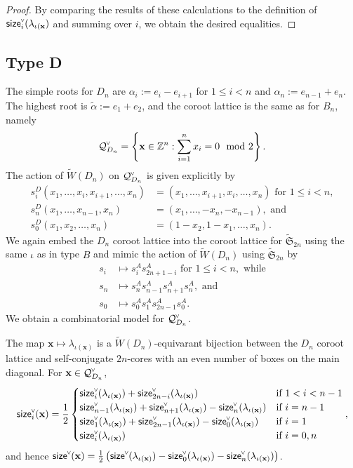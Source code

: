 \documentclass[ALCO,published]{cedram}
\newcommand{\chk}[1]{#1^{\normalfont\smash{\scalebox{.5}[.5]{\rotatebox{90}{\textbf{\textless}}}}}}
\newcommand{\wa}{\widetilde{W}}
\newcommand{\Q}{\mathcal{Q}}
\newcommand{\size}{{\sf size}}
\begin{document}
\begin{proof}
By comparing the results of these calculations to the definition of $\chk{\size}_i(\lambda_{\iota(\mathbf{x}})$ and summing over $i$, we obtain the desired equalities.
\end{proof}


\subsection{Type D}
\label{sec:modelD}

The simple roots for $D_n$ are $\alpha_i:=e_i-e_{i+1}$ for $1\leq i < n$ and $\alpha_n:=e_{n-1}+e_n$.  The highest root is $\widetilde{\alpha}:=e_1+e_2$, and the coroot lattice is the same as for $B_n$, namely \[\chk{\Q}_{D_n} = \left\{\mathbf{x} \in \mathbb{Z}^n : \sum_{i=1}^n x_i = 0 \mod 2\right\}.\]  The action of $\wa(D_n)$ on $\chk{\Q}_{D_n}$ is given explicitly by
\begin{align*}s_i^D(x_1,\ldots,x_i,x_{i+1},\ldots,x_n) &= (x_1,\ldots,x_{i+1},x_{i},\ldots,x_n) \text{ for } 1 \leq i < n,\\
s_n^D(x_1,\ldots,x_{n-1},x_n) &= (x_1,\ldots,-x_n,-x_{n-1}), \text{ and }\\
s_0^D(x_1,x_2,\ldots,x_n) &= (1-x_2,1-x_1,\ldots,x_n).
\end{align*}
We again embed the $D_n$ coroot lattice into the coroot lattice for $\widetilde{\mathfrak{S}}_{2n}$ using the same $\iota$ as in type $B$ and mimic the action of $\wa(D_n)$ using $\widetilde{\mathfrak{S}}_{2n}$ by
\begin{align*}
s_i &\mapsto s_i^A s_{2n+1-i}^A \text{ for } 1 \leq i < n, \text{ while}\\
s_n &\mapsto s_{n}^A s_{n-1}^A s_{n+1}^A s_n^A, \text{ and}\\
s_0 &\mapsto s_0^As_1^As_{2n-1}^As_0^A.
\end{align*}
We obtain a combinatorial model for $\chk{\Q}_{D_n}$.

\begin{theorem}The map $\mathbf{x}\mapsto\lambda_{\iota(\mathbf{x})}$ is a $\wa(D_n)$-equivarant bijection between the $D_n$ coroot lattice and self-conjugate $2n$-cores with an even number of boxes on the main diagonal. For $\mathbf{x} \in \chk{\Q}_{D_n}$, 
\[
\chk{\size}_i(\mathbf{x})= \frac{1}{2}
\begin{cases}
\chk{\size}_i(\lambda_{\iota(\mathbf{x})}) + \chk{\size}_{2n-i}(\lambda_{\iota(\mathbf{x})}) & \text{if } 1<i<n-1 \\ 
\chk{\size}_{n-1}(\lambda_{\iota(\mathbf{x})}) + \chk{\size}_{n+1}(\lambda_{\iota(\mathbf{x})}) -\chk{\size}_{n}(\lambda_{\iota(\mathbf{x})}) & \text{if } i=n-1 \\
\chk{\size}_1(\lambda_{\iota(\mathbf{x})}) + \chk{\size}_{2n-1}(\lambda_{\iota(\mathbf{x})}) -\chk{\size}_0(\lambda_{\iota(\mathbf{x})}) & \text{if } i=1 \\ \chk{\size}_i(\lambda_{\iota(\mathbf{x})}) & \text{if } i=0,n
\end{cases}
,
\] and hence
$\chk{\size}(\mathbf{x}) = \frac{1}{2}\left( \chk{\size}(\lambda_{\iota(\mathbf{x})}) - \chk{\size}_0(\lambda_{\iota(\mathbf{x})}) - \chk{\size}_n(\lambda_{\iota(\mathbf{x})}) \right)$.
\label{ref:dn_cores}
\end{theorem}
\end{document}
